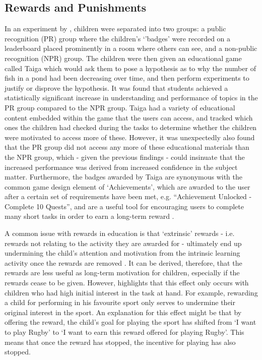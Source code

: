 \subsection{Rewards and Punishments}
In an experiment by \cite{Filsecker2014136}, children were separated into two groups: a public recognition (PR) group where the children's `'badges' were recorded on a leaderboard placed prominently in a room where others can see, and a non-public recognition (NPR) group.
The children were then given an educational game called Taiga which would ask them to pose a hypothesis as to why the number of fish in a pond had been decreasing over time, and then perform experiments to justify or disprove the hypothesis.
It was found that students achieved a statistically significant increase in understanding and performance of topics in the PR group compared to the NPR group.
Taiga had a variety of educational content embedded within the game that the users can access, and tracked which ones the children had checked during the tasks to determine whether the children were motivated to access more of these. 
However, it was unexpectedly also found that the PR group did not access any more of these educational materials than the NPR group, which - given the previous findings - could insinuate that the increased performance was derived from increased confidence in the subject matter. 
Furthermore, the badges awarded by Taiga are synonymous with the common game design element of `Achievements', which are awarded to the user after a certain set of requirements have been met, e.g. ``Achievement Unlocked - Complete 10 Quests'', and are a useful tool for encouraging users to complete many short tasks in order to earn a long-term reward \cite{hamari2011framework}.

A common issue with rewards in education is that `extrinsic' rewards - i.e. rewards not relating to the activity they are awarded for - ultimately end up undermining the child's attention and motivation from the intrinsic learning activity once the rewards are removed \citep{deci2001extrinsic,ACP:ACP2350090502}.
It can be derived,  therefore, that the rewards are less useful as long-term motivation for children, especially if the rewards cease to be given.
However, \cite{cameron2001negative} highlights that this effect only occurs with children who had high initial interest in the task at hand. 
For example, rewarding a child for performing in his favourite sport only serves to undermine their original interest in the sport.
An explanation for this effect might be that by offering the reward, the child's goal for playing the sport has shifted from `I want to play Rugby' to `I want to earn this reward offered for playing Rugby'.
This means that once the reward has stopped, the incentive for playing has also stopped.

